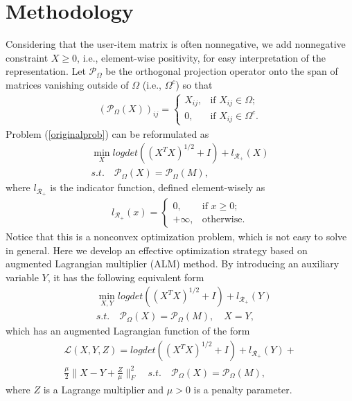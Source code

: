 \documentclass[letterpaper]{article}
\begin{document}
\section{Methodology}
Considering that the user-item matrix is often nonnegative, we add nonnegative constraint $X\ge 0$, i.e., element-wise positivity, for easy interpretation of the representation. Let $\mathcal{P}_\Omega$ be the orthogonal projection operator onto the span of matrices vanishing outside of $\Omega$ (i.e., $\Omega^c$) so that
\begin{eqnarray*}
(\mathcal{P}_\Omega(X))_{ij}=\left\{
\begin{array}{ll} X_{ij}, & \mbox{if $X_{ij}\in\Omega$};\\
0, & \mbox{if $X_{ij}\in\Omega^c$.}
\end{array}\right.
\end{eqnarray*}
Problem (\ref{originalprob}) can be reformulated as
\begin{equation}
\begin{split}
\min_X logdet ((X^TX)^{1/2}+I)+l_{\mathcal{R}_+}(X)   \\
s.t.\quad \mathcal{P}_\Omega(X)=\mathcal{P}_\Omega(M),
\end{split}
\end{equation}
where $l_{\mathcal{R}_+}$ is the indicator function, defined element-wisely as
\begin{eqnarray*}
\label{error21}
l_{\mathcal{R}_+}(x)=\left\{
\begin{array}{ll} 0, & \mbox{if $x\geq 0$};\\
+\infty, & \mbox{otherwise.}
\end{array}\right.
\end{eqnarray*}
Notice that this is a nonconvex optimization problem, which is not easy to solve in general. Here we develop an effective optimization strategy based on augmented Lagrangian
multiplier (ALM) method. By introducing an auxiliary variable $Y$, it has the following equivalent form
\begin{equation}
\label{secondprob}
\begin{split}
&\min_{X, Y} logdet ((X^TX)^{1/2}+I)+l_{\mathcal{R}_+}(Y)   \\
&s.t.\quad \mathcal{P}_\Omega(X)=\mathcal{P}_\Omega(M),\quad X=Y,
\end{split}
\end{equation}
which has an augmented Lagrangian function of the form
\begin{equation}
\begin{split}
\mathcal{L}(X,Y,Z)= logdet ((X^TX)^{1/2}+I)+l_{\mathcal{R}_+}(Y)+\\
\frac{\mu}{2}\|X-Y+\frac{Z}{\mu}\|_F^2
\quad s.t.\quad \mathcal{P}_\Omega(X)=\mathcal{P}_\Omega(M),
\end{split}
\end{equation}
where $Z$ is a Lagrange multiplier and $\mu>0$ is a penalty parameter.
\end{document}
